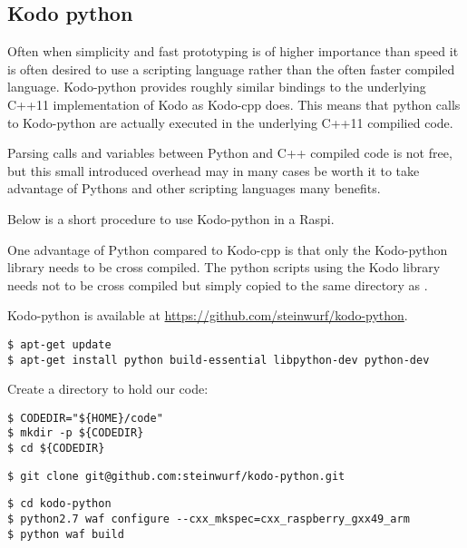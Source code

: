 \subsection{Kodo python}

Often when simplicity and fast prototyping is of higher importance than speed
it is often desired to use a scripting language rather than the often faster
compiled language. Kodo-python provides roughly similar bindings to the
underlying C++11 implementation of Kodo as Kodo-cpp does. This means that
python calls to Kodo-python are actually executed in the underlying C++11
compilied code.

Parsing calls and variables between Python and C++ compiled code is
not free, but this small introduced overhead may in many cases be worth
it to take advantage of Pythons and other scripting languages many
benefits.

Below is a short procedure to use Kodo-python in a \ac{Raspi}.

One advantage of Python compared to Kodo-cpp is that only the Kodo-python
library needs to be cross compiled. The python scripts using the Kodo
library needs not to be cross compiled but simply copied to the same
directory as .

Kodo-python is available at \url{https://github.com/steinwurf/kodo-python}.



\begin{lstlisting}[]
$ apt-get update
$ apt-get install python build-essential libpython-dev python-dev
\end{lstlisting}
\FloatBarrier
\vspace{-5mm}


Create a directory to hold our code:
\begin{lstlisting}[]
$ CODEDIR="${HOME}/code"
$ mkdir -p ${CODEDIR}
$ cd ${CODEDIR}
\end{lstlisting}
\FloatBarrier
\vspace{-5mm}

\begin{lstlisting}[]
$ git clone git@github.com:steinwurf/kodo-python.git 
\end{lstlisting}
\FloatBarrier
\vspace{-5mm}

\begin{lstlisting}[]
$ cd kodo-python
$ python2.7 waf configure --cxx_mkspec=cxx_raspberry_gxx49_arm
$ python waf build
\end{lstlisting}
\FloatBarrier
\vspace{-5mm}

